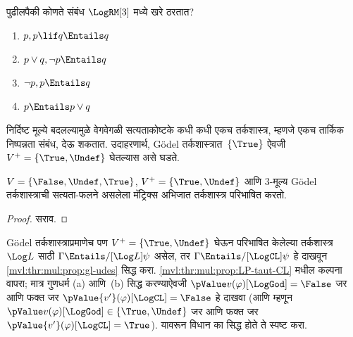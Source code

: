 \begin{prob}
  पुढीलपैकी कोणते संबंध $\LogRM[3]$ मध्ये खरे ठरतात?
  \begin{enumerate}
    \item $p, p \lif q \Entails q$
    \item $p \lor q, \lnot p \Entails q$
    \item $\lnot p, p \Entails q$
    \item $p \Entails p \lor q$
  \end{enumerate}
\end{prob}

निर्दिष्ट मूल्ये बदलल्यामुळे वेगवेगळी सत्यताकोष्टके कधी कधी
एकच तर्कशास्त्र, म्हणजे एकच तार्किक निष्पन्नता संबंध, देऊ
शकतात. उदाहरणार्थ, G\"odel तर्कशास्त्रात~$\{\True\}$ ऐवजी
$V^+ = \{\True, \Undef\}$ घेतल्यास असे घडते.

\begin{prop}\label{mvl:thr:mul:prop:gl-udes}
  $V = \{\False, \Undef,\True\}$,
  $V^+=\{\True, \Undef\}$ आणि $3$-मूल्य G\"odel
  तर्कशास्त्राची सत्यता-फलने असलेला मॅट्रिक्स अभिजात
  तर्कशास्त्र परिभाषित करतो.
\end{prop}

\begin{proof}
  सराव.
\end{proof}

\begin{prob}
  G\"odel तर्कशास्त्राप्रमाणेच पण
  $V^+=\{\True,\Undef\}$ घेऊन परिभाषित केलेल्या
  तर्कशास्त्र~$\Log L$ साठी $\Gamma \Entails/[\Log L] \psi$
  असेल, तर $\Gamma \Entails/[\LogCL] \psi$ हे दाखवून
  \ref{mvl:thr:mul:prop:gl-udes} सिद्ध करा.
  \ref{mvl:thr:mul:prop:LP-taut-CL} मधील कल्पना
  वापरा; मात्र गुणधर्म (a) आणि~(b) सिद्ध करण्याऐवजी
  $\pValue v(\varphi)[\LogGod] = \False$ जर आणि फक्त जर
  $\pValue {v'}(\varphi)[\LogCL] = \False$ हे दाखवा (आणि म्हणून
  $\pValue v(\varphi)[\LogGod] \in \{\True,\Undef\}$ जर आणि
  फक्त जर $\pValue {v'}(\varphi)[\LogCL] = \True$).
  यावरून विधान का सिद्ध होते ते स्पष्ट करा.
\end{prob}



